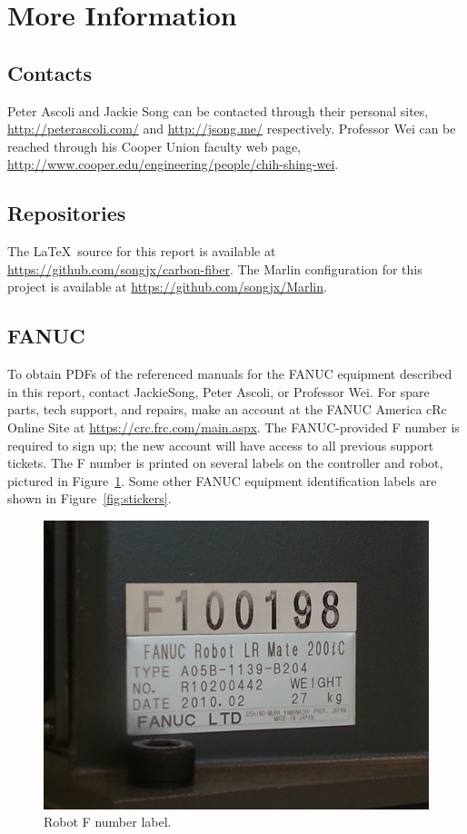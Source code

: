 \section{More Information}
\label{sec:more-info}

\subsection{Contacts}
Peter Ascoli and Jackie Song can be contacted through their personal sites, \url{http://peterascoli.com/} and \url{http://jsong.me/} respectively. Professor Wei can be reached through his Cooper Union faculty web page, \url{http://www.cooper.edu/engineering/people/chih-shing-wei}. 

\subsection{Repositories}
The \LaTeX\ source for this report is available at \url{https://github.com/songjx/carbon-fiber}. The Marlin configuration for this project is available at \url{https://github.com/songjx/Marlin}. 

\subsection{FANUC}
To obtain PDFs of the referenced manuals for the FANUC equipment described in this report, contact JackieSong, Peter Ascoli, or Professor Wei. For spare parts, tech support, and repairs, make an account at the FANUC America cRc Online Site at \url{https://crc.frc.com/main.aspx}. The FANUC-provided F number is required to sign up; the new account will have access to all previous support tickets. The F number is printed on several labels on the controller and robot, pictured in Figure~\ref{fig:f-no}. Some other FANUC equipment identification labels are shown in Figure~\ref{fig:stickers}.  

\begin{figure}
    \centering
    \includegraphics[width=.4\linewidth]{figures/stickers/f-no}
    \caption{Robot F number label.}
    \label{fig:f-no}
\end{figure}

